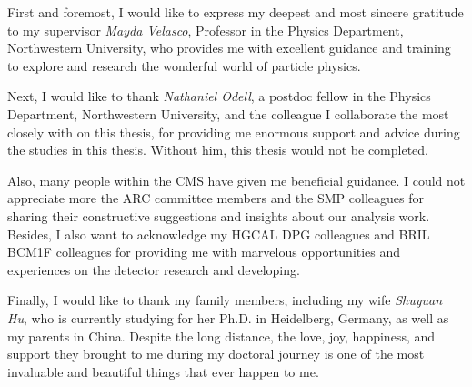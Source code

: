 \documentclass[12pt,reqno]{nuthesis}
\begin{document}
    \acknowledgements

    First and foremost, I would like to express my deepest and most sincere gratitude to my supervisor \textit{Mayda Velasco}, Professor in the Physics Department, Northwestern University, who provides me with excellent guidance and training to explore and research the wonderful world of particle physics. 

    Next, I would like to thank \textit{Nathaniel Odell}, a postdoc fellow in the Physics Department, Northwestern University, and the colleague I collaborate the most closely with on this thesis, for providing me enormous support and advice during the studies in this thesis. Without him, this thesis would not be completed. 

    Also, many people within the CMS have given me beneficial guidance. I could not appreciate more the ARC committee members and the SMP colleagues for sharing their constructive suggestions and insights about our analysis work. Besides, I also want to acknowledge my HGCAL DPG colleagues and BRIL BCM1F colleagues for providing me with marvelous opportunities and experiences on the detector research and developing.

    Finally, I would like to thank my family members, including my wife \textit{Shuyuan Hu}, who is currently studying for her Ph.D. in Heidelberg, Germany, as well as my parents in China. Despite the long distance, the love, joy, happiness, and support they brought to me during my doctoral journey is one of the most invaluable and beautiful things that ever happen to me.



    \clearpage{} 
    \setcounter{tocdepth}{2}
    \begin{spacing}{1.5}
        \tableofcontents	
    \end{spacing}

    \clearpage{} 
    \listoftables

    \clearpage{} 
    \listoffigures



    \mainmatter
    
    
\end{document}
